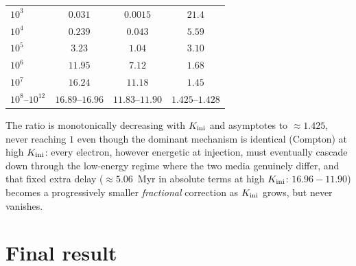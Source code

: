 \documentclass[11pt,a4paper]{article}
\begin{document}
\begin{enumerate}
\begin{center}
\begin{tabular}{@{}lccc@{}}
\midrule
$10^3$  & $0.031$  & $0.0015$ & $21.4$ \\
$10^4$  & $0.239$  & $0.043$  & $5.59$ \\
$10^5$  & $3.23$   & $1.04$   & $3.10$ \\
$10^6$  & $11.95$  & $7.12$   & $1.68$ \\
$10^7$  & $16.24$  & $11.18$  & $1.45$ \\
$10^8$--$10^{12}$ & $16.89$--$16.96$ & $11.83$--$11.90$ & $1.425$--$1.428$ \\
\bottomrule
\end{tabular}
\end{center}
      The ratio is monotonically decreasing with $K_{\rm ini}$ and asymptotes to $\approx1.425$, never
      reaching $1$ even though the dominant mechanism is identical (Compton) at high $K_{\rm ini}$: every
      electron, however energetic at injection, must eventually cascade down through the low-energy regime
      where the two media genuinely differ, and that fixed extra delay ($\approx5.06$~Myr in absolute
      terms at high $K_{\rm ini}$: $16.96-11.90$) becomes a progressively smaller \emph{fractional}
      correction as $K_{\rm ini}$ grows, but never vanishes.
\end{enumerate}

\section{Final result}
\label{sec:final}
\end{document}
